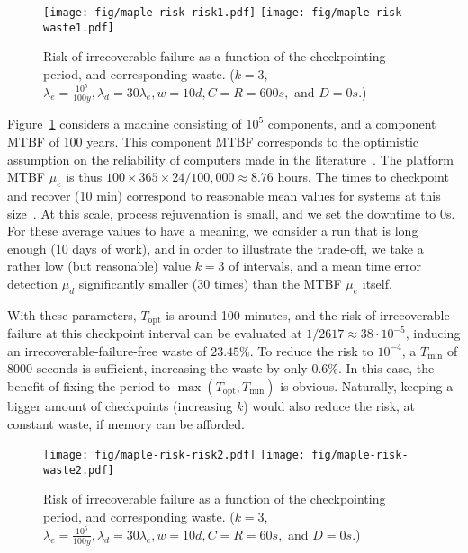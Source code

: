 \documentclass[10pt,table]{article}
\newcommand{\ema}[1]{\ensuremath{#1}\xspace}
\newcommand{\www}{\ema{w}}
\newcommand{\lambdae}{\ema{\lambda_{e}}}
\newcommand{\lambdad}{\ema{\lambda_{d}}}
\newcommand{\mue}{\ema{\mu_{e}}}
\newcommand{\mud}{\ema{\mu_{d}}}
\newcommand{\ccc}{\ema{C}}
\newcommand{\rrr}{\ema{R}}
\newcommand{\ddd}{\ema{D}}
\newcommand{\Topt}{\ema{T_{\text{opt}}}}
\begin{document}
\begin{figure}
\begin{center}
\texttt{[image: fig/maple-risk-risk1.pdf]}
\texttt{[image: fig/maple-risk-waste1.pdf]}
\caption{Risk of irrecoverable failure as a function of the checkpointing
  period, and corresponding waste. {\footnotesize($k=3$, $\lambdae\!=\!\frac{10^5}{100y}, \lambdad=30\lambdae,
  \www=10d, \ccc=\rrr=600s,$ and $\ddd=0s$.)}}
\label{fig:maple:risk1}
\end{center}
\end{figure}

Figure~\ref{fig:maple:risk1} considers a machine consisting of $10^5$
components, and a component MTBF of 100 years. This component MTBF
corresponds to the optimistic assumption on the reliability of
computers made in the literature~\cite{IESP-toward,IESP-Exascale}.
The platform MTBF $\mue$ is thus $100\times 365\times 24/100,000 \approx 8.76$
hours.  The times to checkpoint and recover (10 min) correspond to
reasonable mean values for systems at this
size~\cite{c178,Ferreira2011}. At this scale, process rejuvenation is
small, and we set the downtime to 0s. For these average values to have a
meaning, we consider a run that is long enough (10 days of work), and
in order to illustrate the trade-off, we take a rather low (but
reasonable) value $k=3$ of intervals, and a mean time error
detection $\mud$ significantly smaller (30 times) than the MTBF $\mue$
itself.

With these parameters, $\Topt$ is around 100 minutes, and the
risk of irrecoverable failure at this checkpoint interval can be evaluated
at $1/2617\approx 38\cdot 10^{-5}$, inducing an irrecoverable-failure-free waste of $23.45\%$. To
reduce the risk to $10^{-4}$, a $T_{\min}$ of $8000$ seconds is sufficient,
increasing the waste by only $0.6\%$. In this case, the benefit of
fixing the period to $\max(\Topt, T_{\min})$ is obvious. Naturally,
keeping a bigger amount of checkpoints (increasing $k$) would also
reduce the risk, at constant waste, if memory can be afforded.

\begin{figure}
\begin{center}
\texttt{[image: fig/maple-risk-risk2.pdf]}
\texttt{[image: fig/maple-risk-waste2.pdf]}
\caption{Risk of irrecoverable failure as a function of the checkpointing
  period, and corresponding waste. {\footnotesize($k=3$, $\lambdae=\frac{10^5}{100y}, \lambdad=30\lambdae,
  \www=10d, \ccc=\rrr=60s,$ and $\ddd=0s$.)}}
\vspace{-.6cm}
\label{fig:maple:risk2}
\end{center}
\end{figure}
\end{document}
